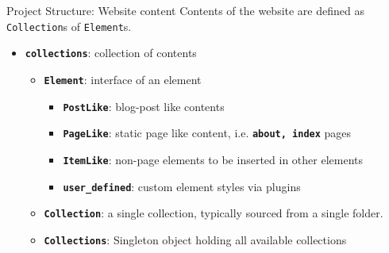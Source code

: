 \documentclass[compress, aspectratio=169]{beamer}
\renewcommand{\imp}[1]{\texttt{\textbf{#1}}}
\begin{document}
\begin{frame}{Project Structure: Website content}
    Contents of the website are defined as \texttt{Collection}s of \texttt{Element}s.
    \begin{itemize}[<+->]
        \item \imp{collections}: collection of contents
            \begin{itemize}
                \item \imp{Element}: interface of an element 
                    \begin{itemize}
                        \item \imp{PostLike}: blog-post like contents 
                        \item \imp{PageLike}: static page like content, i.e.
                            \imp{about, index} pages
                        \item \imp{ItemLike}: non-page elements to be inserted in
                            other elements
                        \item \imp{user_defined}: custom element styles via plugins
                    \end{itemize}
                    \pause
                \item \imp{Collection}: a single collection, typically sourced from a
                    single folder. 
                \item \imp{Collections}: Singleton object holding all available
                    collections
            \end{itemize}
    \end{itemize}
\end{frame}
\end{document}
